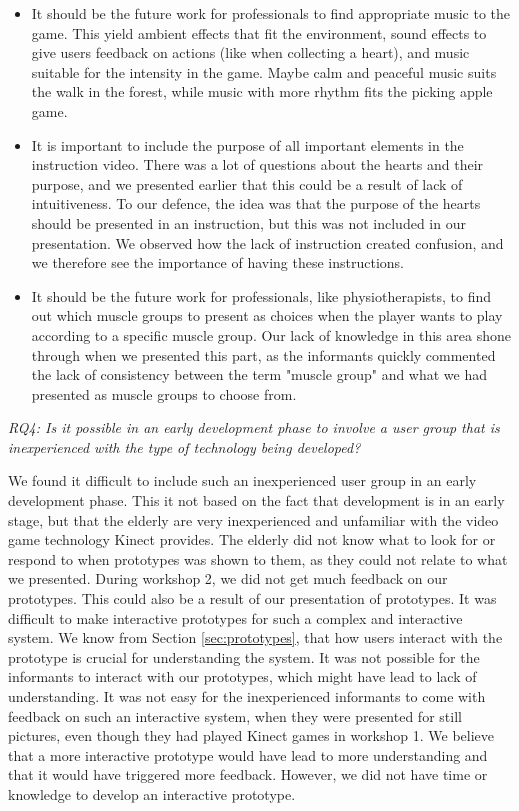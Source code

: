 \begin{itemize}
\item It should be the future work for professionals to find appropriate music to the game. This yield ambient effects that fit the environment, sound effects to give users feedback on actions (like when collecting a heart), and music suitable for the intensity in the game. Maybe calm and peaceful music suits the walk in the forest, while music with more rhythm fits the picking apple game. 
\item It is important to include the purpose of all important elements in the instruction video. There was a lot of questions about the hearts and their purpose, and we presented earlier that this could be a result of lack of intuitiveness. To our defence, the idea was that the purpose of the hearts should be presented in an instruction, but this was not included in our presentation. We observed how the lack of instruction created confusion, and we therefore see the importance of having these instructions.  
\item It should be the future work for professionals, like physiotherapists, to find out which muscle groups to present as choices when the player wants to play according to a specific muscle group. Our lack of knowledge in this area shone through when we presented this part, as the informants quickly commented the lack of consistency between the term "muscle group" and what we had presented as muscle groups to choose from. 
\end{itemize}

\emph{RQ4: Is it possible in an early development phase to involve a user group that is inexperienced with the type of technology being developed?}

We found it difficult to include such an inexperienced user group in an early development phase. This it not based on the fact that development is in an early stage, but that the elderly are very inexperienced and unfamiliar with the video game technology Kinect provides. The elderly did not know what to look for or respond to when prototypes was shown to them, as they could not relate to what we presented. During workshop 2, we did not get much feedback on our prototypes. This could also be a result of our presentation of prototypes. It was difficult to make interactive prototypes for such a complex and interactive system. We know from Section \ref{sec:prototypes}, that how users interact with the prototype is crucial for understanding the system. It was not possible for the informants to interact with our prototypes, which might have lead to lack of understanding. It was not easy for the inexperienced informants to come with feedback on such an interactive system, when they were presented for still pictures, even though they had played Kinect games in workshop 1. We believe that a more interactive prototype would have lead to more understanding and that it would have triggered more feedback. However, we did not have time or knowledge to develop an interactive prototype. 
 

